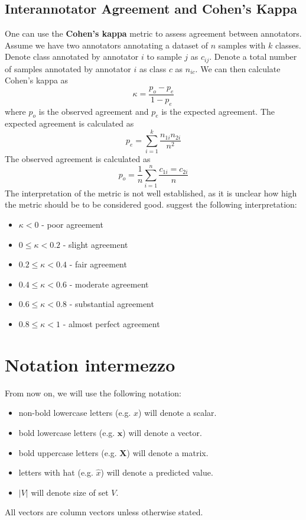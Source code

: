 \subsection{Interannotator Agreement and Cohen's Kappa}
\label{sec:interannotator}
One can use the \textbf{Cohen's kappa} metric to assess agreement between annotators.
Assume we have two annotators annotating a dataset of $n$ samples with $k$ classes.
Denote class annotated by annotator $i$ to sample $j$ as $c_{ij}$.
Denote a total number of samples annotated by annotator $i$ as class $c$ as $n_{ic}$.
We can then calculate Cohen's kappa as
\begin{equation}
    \label{eq:kappa}
    \kappa = \frac{p_o - p_e}{1 - p_e}
\end{equation}
where $p_o$ is the observed agreement and $p_e$ is the expected agreement.
The expected agreement is calculated as
\begin{equation}
    \label{eq:pe}
    p_e = \sum_{i=1}^k \frac{n_{1i} n_{2i}}{n^2}
\end{equation}
The observed agreement is calculated as
\begin{equation}
    \label{eq:po}
    p_o = \frac{1}{n} \sum_{i=1}^n \frac{c_{1i} = c_{2i}}{n}
\end{equation}
The interpretation of the metric is not well established, as
it is unclear how high the metric should be to be considered good.
\textcite[page 165]{landisMeasurementObserverAgreement1977} suggest the following interpretation:
\begin{itemize}
    \item $\kappa < 0$ - poor agreement
    \item $0 \leq \kappa < 0.2$ - slight agreement
    \item $0.2 \leq \kappa < 0.4$ - fair agreement
    \item $0.4 \leq \kappa < 0.6$ - moderate agreement
    \item $0.6 \leq \kappa < 0.8$ - substantial agreement
    \item $0.8 \leq \kappa < 1$ - almost perfect agreement
\end{itemize}

\section{Notation intermezzo}
\label{sec:notation}
From now on, we will use the following notation:
\begin{itemize}
    \item non-bold lowercase letters (e.g. $x$) will denote a scalar.
    \item bold lowercase letters (e.g. $\mathbf{x}$) will denote a vector.
    \item bold uppercase letters (e.g. $\mathbf{X}$) will denote a matrix.
    \item letters with hat (e.g. $\hat{x}$) will denote a predicted value.
    \item $|V|$ will denote size of set $V$.
\end{itemize}
All vectors are column vectors unless otherwise stated.

